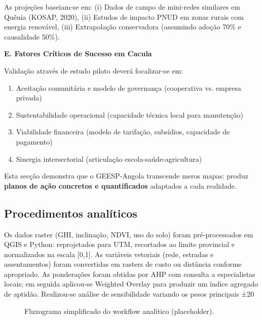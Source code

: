 \documentclass[12pt, a4paper]{article}
\begin{document}
As projeções baseiam-se em: (i) Dados de campo de mini-redes similares em Quênia 
(KOSAP, 2020), (ii) Estudos de impacto PNUD em zonas rurais com energia renovável, 
(iii) Extrapolação conservadora (assumindo adoção 70\% e causalidade 50\%).

\textbf{E. Fatores Críticos de Sucesso em Cacula}

Validação através de estudo piloto deverá focalizar-se em:
\begin{enumerate}
\item Aceitação comunitária e modelo de governança (cooperativa vs. empresa privada)
\item Sustentabilidade operacional (capacidade técnica local para manutenção)
\item Viabilidade financeira (modelo de tarifação, subsídios, capacidade de pagamento)
\item Sinergia intersectorial (articulação escola-saúde-agricultura)
\end{enumerate}

Esta secção demonstra que o GEESP-Angola transcende meros mapas: produz 
\textbf{planos de ação concretos e quantificados} adaptados a cada realidade.

\subsection{Procedimentos analíticos}

Os dados raster (GHI, inclinação, NDVI, uso do solo) foram pré‑processados em QGIS e Python: reprojetados para UTM, recortados ao limite provincial e normalizados na escala [0,1]. As variáveis vetoriais (rede, estradas e assentamentos) foram convertidas em rasters de custo ou distância conforme apropriado. As ponderações foram obtidas por AHP com consulta a especialistas locais; em seguida aplicou‑se Weighted Overlay para produzir um índice agregado de aptidão. Realizou‑se análise de sensibilidade variando os pesos principais ±20%

\begin{figure}[H]
\centering
{}
\caption{Fluxograma simplificado do workflow analítico (placeholder).}
\label{fig:fluxograma}
\end{figure}
\end{document}
